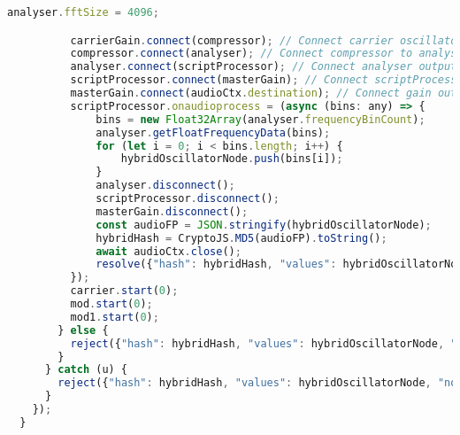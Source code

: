 \begin{lstlisting}[language=JavaScript, caption=Amplitude Modulation Hybrid fingerprint generation code, label=amplitudeModualtionHybridFingerprintGenerationCode]
          analyser.fftSize = 4096;

          carrierGain.connect(compressor); // Connect carrier oscillator output to dynamic compressor
          compressor.connect(analyser); // Connect compressor to analyser
          analyser.connect(scriptProcessor); // Connect analyser output to scriptProcessor input
          scriptProcessor.connect(masterGain); // Connect scriptProcessor output to gain input
          masterGain.connect(audioCtx.destination); // Connect gain output to audiocontext destination
          scriptProcessor.onaudioprocess = (async (bins: any) => {
              bins = new Float32Array(analyser.frequencyBinCount);
              analyser.getFloatFrequencyData(bins);
              for (let i = 0; i < bins.length; i++) {
                  hybridOscillatorNode.push(bins[i]);
              }
              analyser.disconnect();
              scriptProcessor.disconnect();
              masterGain.disconnect();
              const audioFP = JSON.stringify(hybridOscillatorNode);
              hybridHash = CryptoJS.MD5(audioFP).toString();
              await audioCtx.close();
              resolve({"hash": hybridHash, "values": hybridOscillatorNode, "noFingerprint": false});
          });
          carrier.start(0);
          mod.start(0);
          mod1.start(0);
        } else {
          reject({"hash": hybridHash, "values": hybridOscillatorNode, "noFingerprint": true});
        }
      } catch (u) {
        reject({"hash": hybridHash, "values": hybridOscillatorNode, "noFingerprint": true});
      }
    });
  }
\end{lstlisting}

